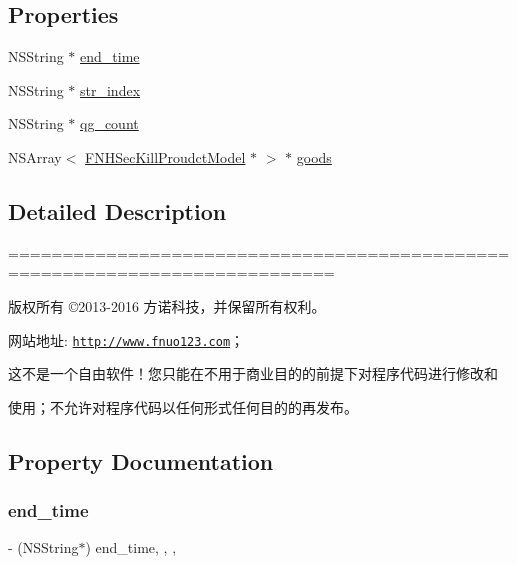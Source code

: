 \subsection*{Properties}
\begin{DoxyCompactItemize}
\item 
N\+S\+String $\ast$ \mbox{\hyperlink{interface_j_m_hi_buy_seckill_model_a070315386e67fb49bcd29d754be83870}{end\+\_\+time}}
\item 
N\+S\+String $\ast$ \mbox{\hyperlink{interface_j_m_hi_buy_seckill_model_ac5892e2403bc7789287763b3d6ad236d}{str\+\_\+index}}
\item 
N\+S\+String $\ast$ \mbox{\hyperlink{interface_j_m_hi_buy_seckill_model_af4096f2b5ea6d85b65d92849ce8f9a7b}{qg\+\_\+count}}
\item 
N\+S\+Array$<$ \mbox{\hyperlink{interface_f_n_h_sec_kill_proudct_model}{F\+N\+H\+Sec\+Kill\+Proudct\+Model}} $\ast$ $>$ $\ast$ \mbox{\hyperlink{interface_j_m_hi_buy_seckill_model_afa9045c7e5f0c815ac1d057997a986ab}{goods}}
\end{DoxyCompactItemize}


\subsection{Detailed Description}
============================================================================

版权所有 ©2013-\/2016 方诺科技，并保留所有权利。

网站地址\+: \href{http://www.fnuo123.com}{\tt http\+://www.\+fnuo123.\+com}； 



这不是一个自由软件！您只能在不用于商业目的的前提下对程序代码进行修改和

使用；不允许对程序代码以任何形式任何目的的再发布。 

 

\subsection{Property Documentation}
\mbox{\label{interface_j_m_hi_buy_seckill_model_a070315386e67fb49bcd29d754be83870}} 
\subsubsection{\texorpdfstring{end\+\_\+time}{end\_time}}
{\footnotesize\ttfamily -\/ (N\+S\+String$\ast$) end\+\_\+time\hspace{0.3cm}{\ttfamily [read]}, {\ttfamily [write]}, {\ttfamily [nonatomic]}, {\ttfamily [copy]}}

